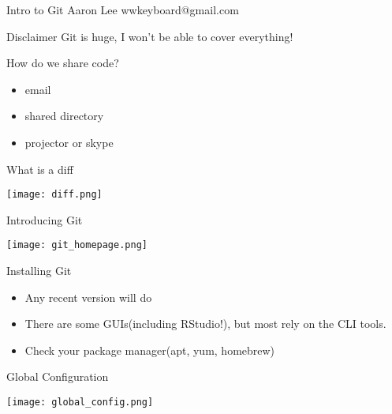 \documentclass{beamer}
\begin{document}
\begin{frame}{Intro to Git}
Aaron Lee
wwkeyboard@gmail.com
\end{frame}

\begin{frame}{Disclaimer}
Git is huge, I won't be able to cover everything!
\end{frame}

\begin{frame}{How do we share code?}
  \begin{center}
    \begin{itemize}
      \item email
      \item shared directory
      \item projector or skype
    \end{itemize}
  \end{center}
\end{frame}

\begin{frame}{What is a diff}
  \begin{center}
    \texttt{[image: diff.png]}
  \end{center}
\end{frame}

\begin{frame}{Introducing Git\!}
  \begin{center}
    \texttt{[image: git\_homepage.png]}
  \end{center}
\end{frame}

\begin{frame}{Installing Git}
  \begin{center}
    \begin{itemize}
      \item Any recent version will do
      \item There are some GUIs(including RStudio!), but most rely on
        the CLI tools.
      \item Check your package manager(apt, yum, homebrew)
    \end{itemize}
  \end{center}
\end{frame}

\begin{frame}{Global Configuration}
  \begin{center}
    \texttt{[image: global\_config.png]}
  \end{center}
\end{frame}
\end{document}
